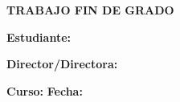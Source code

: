 
\hypersetup{pageanchor=false}
\begin{titlepage}

  \vspace*{1cm}

  {\noindent\large\bfseries \MakeUppercase{\thesisDegree}\par}
  \smallskip
  {\noindent\Huge\bfseries TRABAJO FIN DE GRADO\par}
  \vspace{1.5cm}

  \begin{center}
    {\LARGE\bfseries\itshape \thesisTitle\par}

    \vfill
    \vfill
  \end{center}
  \vfill

  \noindent\textbf{Estudiante:} \thesisAuthorFormal\par
  \medskip
  \noindent\textbf{Director/Directora:} \thesisDirector\par
  \bigskip
  \noindent\textbf{Curso:} \thesisCourse\hfill\textbf{Fecha:} \thesisDate\par

\end{titlepage}
\hypersetup{pageanchor=true}
